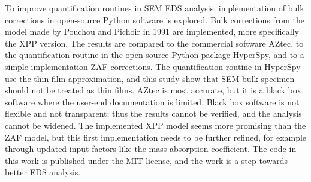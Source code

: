 To improve quantification routines in SEM EDS analysis, implementation of bulk corrections in open-source Python software is explored.
Bulk corrections from the model made by Pouchou and Pichoir in 1991 are implemented, more specifically the XPP version.
The results are compared to the commercial software AZtec, to the quantification routine in the open-source Python package HyperSpy, and to a simple implementation ZAF corrections.
The quantification routine in HyperSpy use the thin film approximation, and this study show that SEM bulk specimen should not be treated as thin films.
AZtec is most accurate, but it is a black box software where the user-end documentation is limited.
Black box software is not flexible and not transparent; thus the results cannot be verified, and the analysis cannot be widened.
The implemented XPP model seems more promising than the ZAF model, but this first implementation needs to be further refined, for example through updated input factors like the mass absorption coefficient. %
The code in this work is published under the MIT license, and the work is a step towards better EDS analysis. %



